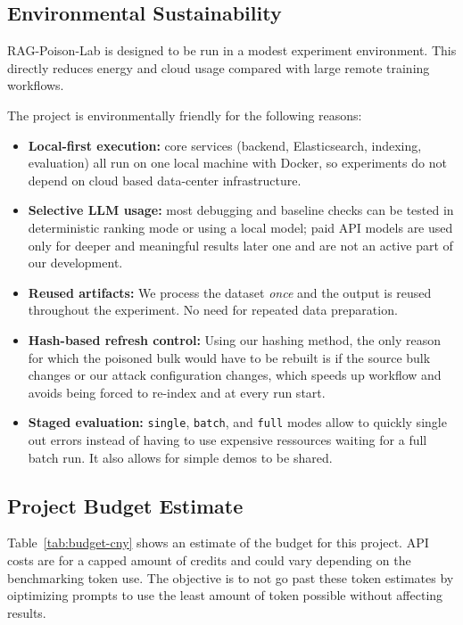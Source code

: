 \subsection{Environmental Sustainability}
RAG-Poison-Lab is designed to be run in a modest experiment environment. This directly reduces energy and cloud usage compared with large remote training workflows.

The project is environmentally friendly for the following reasons:
\begin{itemize}
  \item \textbf{Local-first execution:} core services (backend, Elasticsearch, indexing, evaluation) all run on one local machine with Docker, so experiments do not depend on cloud based data-center infrastructure.
  \item \textbf{Selective LLM usage:} most debugging and baseline checks can be tested in deterministic ranking mode or using a local model; paid API models are used only for deeper and meaningful results later one and are not an active part of our development.
  \item \textbf{Reused artifacts:} We process the dataset \emph{once} and the output is reused throughout the experiment. No need for repeated data preparation.
  \item \textbf{Hash-based refresh control:} Using our hashing method, the only reason for which the poisoned bulk would have to be rebuilt is if the source bulk changes or our attack configuration changes, which speeds up workflow and avoids being forced to re-index and at every run start.
  \item \textbf{Staged evaluation:} \texttt{single}, \texttt{batch}, and \texttt{full} modes allow to quickly single out errors instead of having to use expensive ressources waiting for a full batch run. It also allows for simple demos to be shared.
\end{itemize}


\subsection{Project Budget Estimate}
Table~\ref{tab:budget-cny} shows an estimate of the budget for this project. API costs are for a capped amount of credits and could vary depending on the benchmarking token use. The objective is to not go past these token estimates by oiptimizing prompts to use the least amount of token possible without affecting results.

